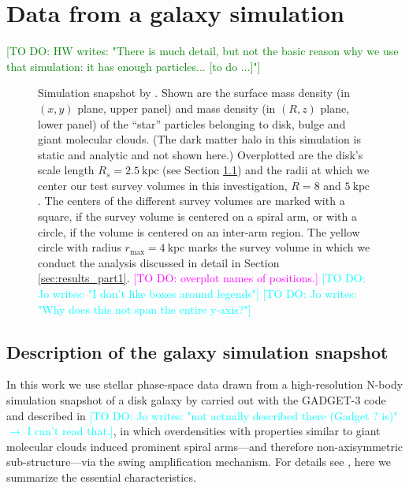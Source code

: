 \documentclass[iop,revtex4,numberedappendix,appendixfloats]{emulateapj}
\newcommand{\Wilma}[1]{\textcolor{Magenta}{#1}}
\newcommand{\HW}[1]{\textcolor{Green}{#1}}
\newcommand{\Jo}[1]{\textcolor{Cyan}{#1}}
\begin{document}
\section{Data from a galaxy simulation} \label{sec:simulation}

\HW{[TO DO: HW writes: "There is much detail, but not the basic reason why we use that simulation: it has enough particles... [to do ...]"]}

\begin{figure}[!htbp]
\caption{Simulation snapshot by \citet{2013ApJ...766...34D}. Shown are the surface mass density (in $(x,y)$ plane, upper panel) and mass density (in $(R,z)$ plane, lower panel) of the ``star'' particles belonging to disk, bulge and giant molecular clouds. (The dark matter halo in this simulation is static and analytic and not shown here.) Overplotted are the disk's scale length $R_s=2.5~\text{kpc}$ (see Section \ref{sec:simulation_description}) and the radii at which we center our test survey volumes in this investigation, $R=8$ and $5~\text{kpc}$. The centers of the different survey volumes are marked with a square, if the survey volume is centered on a spiral arm, or with a circle, if the volume is centered on an inter-arm region. The yellow circle with radius $r_\text{max}=4~\text{kpc}$ marks the survey volume in which we conduct the analysis discussed in detail in Section \ref{sec:results_part1}. \Wilma{[TO DO: overplot names of positions.]} \Jo{[TO DO: Jo writes: "I don't like boxes around legends"]} \Jo{[TO DO: Jo writes: "Why does this not span the entire y-axis?"]}}
\label{fig:simulation}
\end{figure}

\subsection{Description of the galaxy simulation snapshot} \label{sec:simulation_description}

In this work we use stellar phase-space data drawn from a high-resolution N-body simulation snapshot of a disk galaxy by \citet{2013ApJ...766...34D} carried out with the GADGET-3 code and described in \citet{2005MNRAS.361..776S} \Jo{[TO DO: Jo writes: "not actually described there (Gadget ? is)" $\longrightarrow$ I can't read that.]}, in which overdensities with properties similar to giant molecular clouds induced prominent spiral arms---and therefore non-axisymmetric sub-structure---via the swing amplification mechanism. For details see \citet{2013ApJ...766...34D}, here we summarize the essential characteristics.
\end{document}
